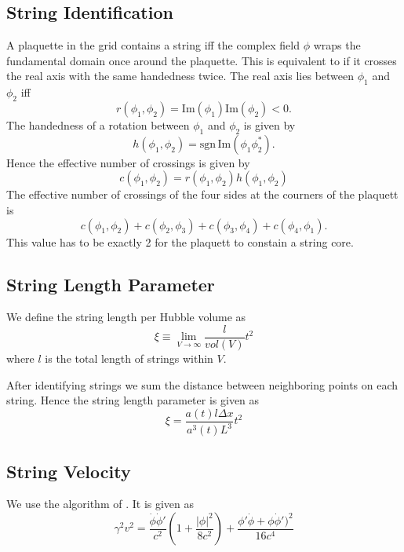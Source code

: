 \documentclass[a4paper]{article}
\begin{document}
\subsection{String Identification}
A plaquette in the grid contains a string iff the complex field $\phi$ wraps the fundamental domain once around the plaquette.
This is equivalent to if it crosses the real axis with the same handedness twice.
The real axis lies between $\phi_1$ and $\phi_2$ iff
\begin{equation}
	r(\phi_1, \phi_2) = \mathrm{Im}(\phi_1) \mathrm{Im}(\phi_2) < 0.
\end{equation} 
The handedness of a rotation between $\phi_1$ and $\phi_2$ is given by
\begin{equation}
	h(\phi_1, \phi_2) = \mathrm{sgn} \, \mathrm{Im} (\phi_1 \phi_2^*).
\end{equation}
Hence the effective number of crossings is given by
\begin{equation}
	c(\phi_1, \phi_2) = r(\phi_1, \phi_2) h(\phi_1, \phi_2)
\end{equation}
The effective number of crossings of the four sides at the courners of the plaquett is
\begin{equation}
	c(\phi_1, \phi_2) + c(\phi_2, \phi_3) + c(\phi_3, \phi_4) + c(\phi_4, \phi_1).
\end{equation}
This value has to be exactly 2 for the plaquett to constain a string core.

\subsection{String Length Parameter}
We define the string length per Hubble volume as
\begin{equation}
    \xi \equiv \lim_{V \to \infty} \frac{l}{vol(V)} t^2
\end{equation}
where $l$ is the total length of strings within $V$.

After identifying strings we sum the distance between neighboring points on each string. Hence the string length parameter is given as 
\begin{equation}
	\xi = \frac{a(t) l \Delta x}{a^3(t) L^3} t^2
\end{equation}

\subsection{String Velocity}
We use the algorithm of \cite[appendix A.2, eq. A.10]{axion_dark_matter_strings_and_their_cores}.
It is given as
\begin{equation}
	\gamma^2 v^2 = \frac{\dot{\phi} \dot{\phi}'}{c^2} \left(1 + \frac{|\phi|^2}{8 c^2} \right) + \frac{\phi' \dot{\phi} + \phi \dot{\phi}')^2}{16 c^4}
\end{equation}
\end{document}
